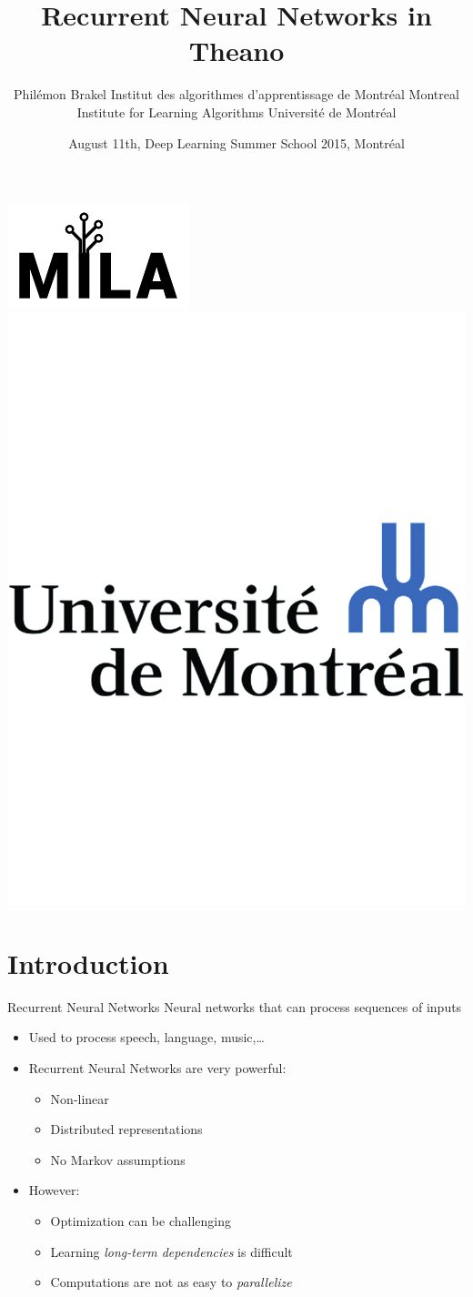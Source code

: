 \documentclass[utf8x,hyperref={pdfpagelabels=false}]{beamer}
\title{Recurrent Neural Networks in Theano}
\author{%
    \footnotesize
    \newline
    \newline
Phil\'{e}mon Brakel \newline
Institut des algorithmes d'apprentissage de Montréal \newline
Montreal Institute for Learning Algorithms \newline
Université de Montréal
}
\date{August 11th, Deep Learning Summer School 2015, Montréal}
\begin{document}
\begin{frame}[plain]
 \titlepage
 \vspace{-2em}
 \includegraphics[width=.8in]{mila.png}
 \hfill
 \includegraphics[width=.8in]{UdeM_logo}
\end{frame}

\setcounter{page}{1}

\section{Introduction}

\begin{frame}{Recurrent Neural Networks}
    Neural networks that can process sequences of inputs
    \begin{itemize}
        \item Used to process speech, language, music,\dots
        \item Recurrent Neural Networks are very powerful:
            \begin{itemize}
            \item Non-linear
            \item Distributed representations
            \item No Markov assumptions
            \end{itemize}
        \item However:
            \begin{itemize}
            \item Optimization can be challenging
            \item Learning \emph{long-term dependencies} is difficult
            \item Computations are not as easy to \emph{parallelize}
            \end{itemize}
    \end{itemize}
\end{frame}
\end{document}
